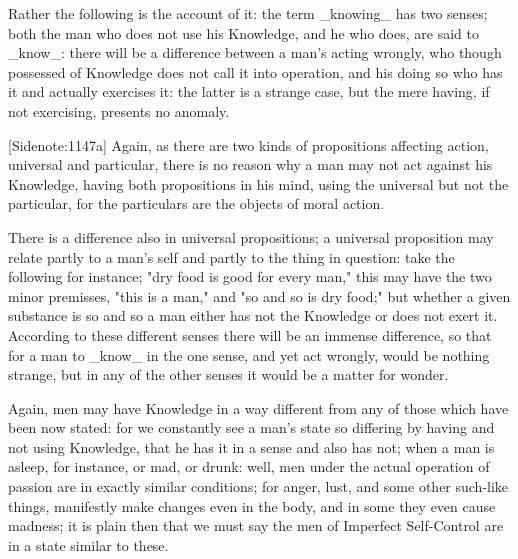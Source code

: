 Rather the following is the account of it: the term _knowing_ has two
senses; both the man who does not use his Knowledge, and he who does,
are said to _know_: there will be a difference between a man's acting
wrongly, who though possessed of Knowledge does not call it into
operation, and his doing so who has it and actually exercises it: the
latter is a strange case, but the mere having, if not exercising,
presents no anomaly.

[Sidenote:1147a] Again, as there are two kinds of propositions affecting
action, universal and particular, there is no reason why a man may not
act against his Knowledge, having both propositions in his mind, using
the universal but not the particular, for the particulars are the
objects of moral action.

There is a difference also in universal propositions; a universal
proposition may relate partly to a man's self and partly to the thing in
question: take the following for instance; "dry food is good for every
man," this may have the two minor premisses, "this is a man," and "so
and so is dry food;" but whether a given substance is so and so a man
either has not the Knowledge or does not exert it. According to these
different senses there will be an immense difference, so that for a
man to _know_ in the one sense, and yet act wrongly, would be nothing
strange, but in any of the other senses it would be a matter for wonder.

Again, men may have Knowledge in a way different from any of those which
have been now stated: for we constantly see a man's state so differing
by having and not using Knowledge, that he has it in a sense and also
has not; when a man is asleep, for instance, or mad, or drunk: well, men
under the actual operation of passion are in exactly similar conditions;
for anger, lust, and some other such-like things, manifestly make
changes even in the body, and in some they even cause madness; it is
plain then that we must say the men of Imperfect Self-Control are in a
state similar to these.

